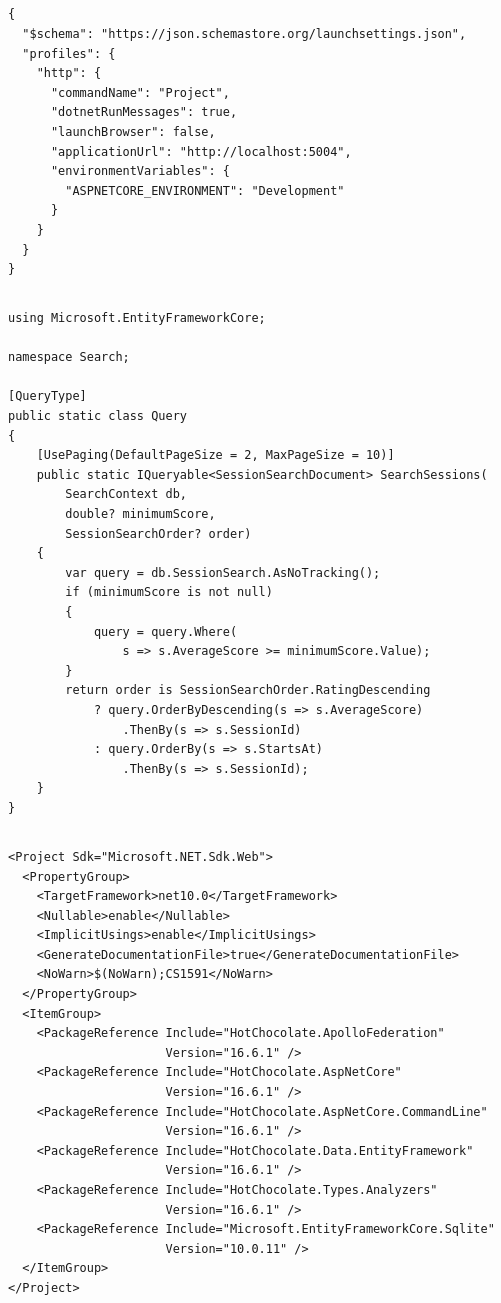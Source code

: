 \subsection*{}
\begin{verbatim}
{
  "$schema": "https://json.schemastore.org/launchsettings.json",
  "profiles": {
    "http": {
      "commandName": "Project",
      "dotnetRunMessages": true,
      "launchBrowser": false,
      "applicationUrl": "http://localhost:5004",
      "environmentVariables": {
        "ASPNETCORE_ENVIRONMENT": "Development"
      }
    }
  }
}
\end{verbatim}

\subsection*{}
\begin{verbatim}
using Microsoft.EntityFrameworkCore;

namespace Search;

[QueryType]
public static class Query
{
    [UsePaging(DefaultPageSize = 2, MaxPageSize = 10)]
    public static IQueryable<SessionSearchDocument> SearchSessions(
        SearchContext db,
        double? minimumScore,
        SessionSearchOrder? order)
    {
        var query = db.SessionSearch.AsNoTracking();
        if (minimumScore is not null)
        {
            query = query.Where(
                s => s.AverageScore >= minimumScore.Value);
        }
        return order is SessionSearchOrder.RatingDescending
            ? query.OrderByDescending(s => s.AverageScore)
                .ThenBy(s => s.SessionId)
            : query.OrderBy(s => s.StartsAt)
                .ThenBy(s => s.SessionId);
    }
}
\end{verbatim}

\subsection*{}
\begin{verbatim}
<Project Sdk="Microsoft.NET.Sdk.Web">
  <PropertyGroup>
    <TargetFramework>net10.0</TargetFramework>
    <Nullable>enable</Nullable>
    <ImplicitUsings>enable</ImplicitUsings>
    <GenerateDocumentationFile>true</GenerateDocumentationFile>
    <NoWarn>$(NoWarn);CS1591</NoWarn>
  </PropertyGroup>
  <ItemGroup>
    <PackageReference Include="HotChocolate.ApolloFederation"
                      Version="16.6.1" />
    <PackageReference Include="HotChocolate.AspNetCore"
                      Version="16.6.1" />
    <PackageReference Include="HotChocolate.AspNetCore.CommandLine"
                      Version="16.6.1" />
    <PackageReference Include="HotChocolate.Data.EntityFramework"
                      Version="16.6.1" />
    <PackageReference Include="HotChocolate.Types.Analyzers"
                      Version="16.6.1" />
    <PackageReference Include="Microsoft.EntityFrameworkCore.Sqlite"
                      Version="10.0.11" />
  </ItemGroup>
</Project>
\end{verbatim}

